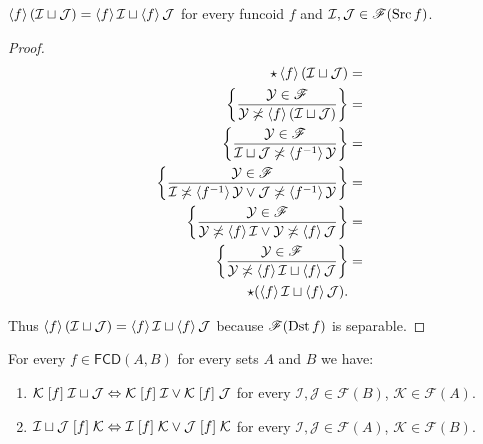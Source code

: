 \begin{prop}
$\left\langle f\right\rangle(\mathcal{I}\sqcup\mathcal{J})=\left\langle f\right\rangle\mathcal{I}\sqcup\left\langle f\right\rangle\mathcal{J}$
for every funcoid $f$ and $\mathcal{I},\mathcal{J}\in\mathscr{F}(\operatorname{Src}
f)$.\end{prop}
\begin{proof}
~
\begin{align*}
\star\left\langle f\right\rangle(\mathcal{I}\sqcup\mathcal{J}) & =\\
\left\{ \frac{\mathcal{Y}\in\mathscr{F}}{\mathcal{Y}\not\asymp\left\langle f\right\rangle(\mathcal{I}\sqcup\mathcal{J})}\right\} & =\\
\left\{ \frac{\mathcal{Y}\in\mathscr{F}}{\mathcal{I}\sqcup\mathcal{J}\not\asymp\left\langle 
f^{-1}\right\rangle\mathcal{Y}}\right\} & =\\
\left\{ \frac{\mathcal{Y}\in\mathscr{F}}{\mathcal{I}\not\asymp\left\langle f^{-1}\right\rangle\mathcal{Y}
\lor\mathcal{J}\not\asymp\left\langle f^{-1}\right\rangle\mathcal{Y}}\right\} & =\\
\left\{ \frac{\mathcal{Y}\in\mathscr{F}}{\mathcal{Y}\not\asymp\left\langle f\right\rangle\mathcal{I}\lor\mathcal{Y}\not\asymp\left\langle f\right\rangle\mathcal{J}}\right\} & =\\
\left\{ \frac{\mathcal{Y}\in\mathscr{F}}{\mathcal{Y}\not\asymp\left\langle f\right\rangle\mathcal{I}\sqcup\left\langle f\right\rangle\mathcal{J}}\right\} & =\\
\star(\left\langle f\right\rangle\mathcal{I}\sqcup\left\langle f\right\rangle\mathcal{J}).
\end{align*}


Thus $\left\langle f\right\rangle(\mathcal{I}\sqcup\mathcal{J})=\left\langle f\right\rangle\mathcal{I}\sqcup\left\langle f\right\rangle\mathcal{J}$
because $\mathscr{F}(\operatorname{Dst} f)$ is separable.\end{proof}
\begin{prop}
For every $f\in\mathsf{FCD}(A,B)$ for every sets $A$ and $B$ we
have:
\begin{enumerate}
\item \label{fcd-f-d1}$\mathcal{K}\mathrel{\left[f\right]}\mathcal{I}\sqcup\mathcal{J}\Leftrightarrow\mathcal{K}\mathrel{\left[f\right]}\mathcal{I}\lor\mathcal{K}\mathrel{\left[f\right]}\mathcal{J}$
for every $\mathcal{I},\mathcal{J}\in\mathscr{F}(B)$,
$\mathcal{K}\in\mathscr{F}(A)$.
\item \label{fcd-f-d2}$\mathcal{I}\sqcup\mathcal{J}\mathrel{\left[f\right]}\mathcal{K}\Leftrightarrow\mathcal{I}\mathrel{\left[f\right]}\mathcal{K}\lor\mathcal{J}\mathrel{\left[f\right]}\mathcal{K}$
for every $\mathcal{I},\mathcal{J}\in\mathscr{F}(A)$,
$\mathcal{K}\in\mathscr{F}(B)$.
\end{enumerate}
\end{prop}
